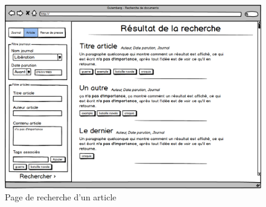     \begin{figure}[H]
        \centering
        \includegraphics[width=\textwidth]{figures/recherche.png}
            \caption{Page de recherche d'un article}
            \label{fig:recherche}
    \end{figure}